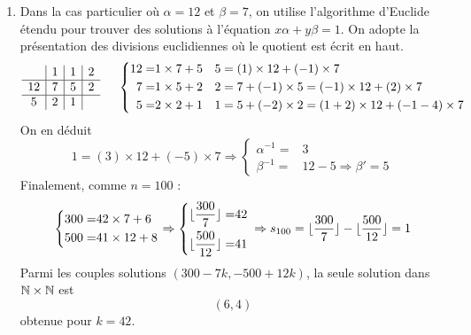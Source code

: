 \begin{enumerate}
\item Dans la cas particulier où $\alpha=12$ et $\beta=7$, on utilise l'algorithme d'Euclide étendu pour trouver des solutions à l'équation $x\alpha +y\beta=1$. On adopte la présentation des divisions euclidiennes où le quotient est écrit \og en haut\fg.
\begin{displaymath}
\begin{array}{c|c|c|c}
   & 1 & 1 & 2  \\ \hline 
12 & 7 & 5 & 2  \\ \hline
5  & 2 & 1 &   \\ 
\end{array}
\hspace{0.5cm}
\left\lbrace 
\begin{aligned}
 12 =& 1\times 7 + 5 & & 5 = (1)\times 12 +(-1)\times 7  \\
 7  =& 1\times 5 +2  & & 2 = 7 +(-1)\times 5 = (-1)\times 12 + (2)\times 7 \\
 5  =& 2\times 2 +1  & & 1 = 5 +(-2)\times 2  = (1+2)\times 12 + (-1 -4)\times 7
\end{aligned}
\right. 
 \end{displaymath}
On en déduit
\begin{displaymath}
 1=(3)\times 12 +(-5)\times 7 \Rightarrow 
\left\lbrace 
\begin{aligned}
 \alpha^{-1}=& 3 \\
 \beta^{-1}=& 12 -5 \Rightarrow \beta'=5
\end{aligned}
\right. 
\end{displaymath}
Finalement, comme $n=100$ :
\begin{displaymath}
 \left\lbrace 
\begin{aligned}
 300 =& 42\times 7 +6 \\
 500 =& 41\times 12 +8
\end{aligned}
 \right. 
\Rightarrow
\left\lbrace 
\begin{aligned}
 \lfloor\frac{300}{7}\rfloor =& 42 \\
 \lfloor\frac{500}{12}\rfloor =& 41 \\
\end{aligned}
\right. \\
\Rightarrow
s_{100}= \lfloor\frac{300}{7}\rfloor - \lfloor\frac{500}{12}\rfloor =1
\end{displaymath}
Parmi les couples solutions $(300-7k,-500+12k)$, la seule solution dans $\mathbb{N}\times \mathbb{N}$ est 
\begin{displaymath}
 (6,4)
\end{displaymath}
obtenue pour $k=42$.

\end{enumerate}

